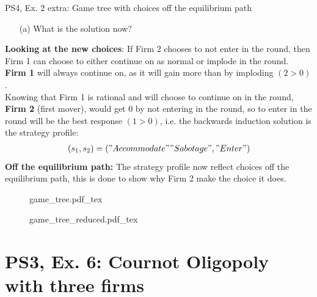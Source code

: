 \begin{frame}{PS4, Ex. 2 extra: Game tree with choices off the equilibrium path}
  \begin{multicols}{2}
    \begin{itemize}
      \item[(a)] What is the solution now?
    \end{itemize}
    \textbf{Looking at the new choices}: If Firm 2 chooses to not enter in the  round, then Firm 1 can choose to either continue on as normal or implode in the  round.\\\medskip
    \textbf{Firm 1} will always continue on, as it will gain more than by imploding $(2>0)$.\\\medskip
    Knowing that Firm 1 is rational and will choose to continue on in the  round, \textbf{Firm 2} (first mover), would get 0 by not entering in the  round, so to enter in the  round will be the best response $(1>0)$, i.e. the backwards induction solution is the strategy profile:
      \begin{align*}
        (s_1,s_2)=("Accommodate""Sabotage","Enter")
      \end{align*}
    \textbf{Off the equilibrium path:} The strategy profile now reflect choices off the equilibrium path, this is done to show why Firm 2 make the choice it does.
  \vfill\null \columnbreak
    \begin{figure}[!h]
      \begin{center}
      \def\svgwidth{1.0\columnwidth}
      {game_tree.pdf_tex}
      \end{center}
    \end{figure}
    \begin{figure}[!h]
      \begin{center}
      \def\svgwidth{1.0\columnwidth}
      {game_tree_reduced.pdf_tex}
      \end{center}
    \end{figure}
  \vfill\null
  \end{multicols}
\end{frame}

\section{PS3, Ex. 6: Cournot Oligopoly with three firms}

